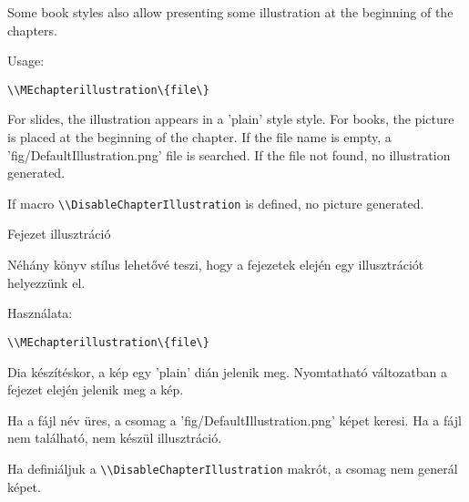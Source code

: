 {
Some book styles also allow presenting some illustration at the beginning of the chapters.
\par Usage:\par
\noindent\lstinline|\\MEchapterillustration\{file\}|

\noindent For slides, the illustration appears in a 'plain' style style.
For books, the picture is placed at the beginning of the chapter.
If the file name is empty, a 'fig/DefaultIllustration.png' file is searched.
If the file not found, no illustration generated.

If macro \lstinline|\\DisableChapterIllustration| is defined, no picture generated.

}
{Fejezet illusztráció}
{
Néhány könyv stílus lehetővé teszi, hogy a fejezetek elején egy illusztrációt helyezzünk el.
\par Használata:\par
\noindent\lstinline|\\MEchapterillustration\{file\}|

\noindent Dia készítéskor, a kép egy 'plain' dián jelenik meg.
Nyomtatható változatban a fejezet elején jelenik meg a kép.

Ha a fájl név üres, a csomag a 'fig/DefaultIllustration.png' képet keresi.
Ha a fájl nem található, nem készül illusztráció.

Ha definiáljuk a  \lstinline|\\DisableChapterIllustration|  makrót,
a csomag nem generál képet. 
}

